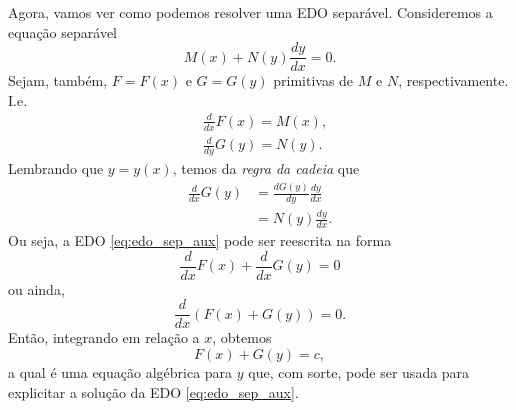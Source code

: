 Agora, vamos ver como podemos resolver uma EDO separável. Consideremos a equação separável
\begin{equation}\label{eq:edo_sep_aux}
  M(x) + N(y)\frac{dy}{dx} = 0.
\end{equation}
Sejam, também, $F=F(x)$ e $G=G(y)$ primitivas de $M$ e $N$, respectivamente. I.e.
\begin{align}
  &\frac{d}{dx}F(x) = M(x),\\
  &\frac{d}{dy}G(y) = N(y).
\end{align}
Lembrando que $y = y(x)$, temos da \emph{regra da cadeia} que
\begin{align}
  \frac{d}{dx}G(y) &= \frac{d G(y)}{dy}\frac{dy}{dx} \\
                   &= N(y)\frac{dy}{dx}.
\end{align}
Ou seja, a EDO \eqref{eq:edo_sep_aux} pode ser reescrita na forma
\begin{equation}
  \frac{d}{dx}F(x) + \frac{d}{dx}G(y) = 0
\end{equation}
ou ainda,
\begin{equation}
  \frac{d}{dx}\left(F(x) + G(y)\right) = 0.
\end{equation}
Então, integrando em relação a $x$, obtemos
\begin{equation}
  F(x) + G(y) = c,
\end{equation}
a qual é uma equação algébrica para $y$ que, com sorte, pode ser usada para explicitar a solução da EDO \eqref{eq:edo_sep_aux}.

